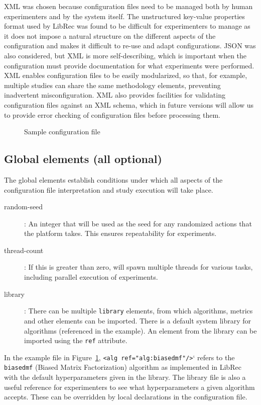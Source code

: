 XML was chosen because configuration files need to be managed both by human experimenters and by the system itself. The unstructured key-value properties format used by LibRec was found to be difficult for experimenters to manage as it does not impose a natural structure on the different aspects of the configuration and makes it difficult to re-use and adapt configurations. JSON was also considered, but XML is more self-describing, which is important when the configuration must provide documentation for what experiments were performed. XML enables configuration files to be easily modularized, so that, for example, multiple studies can share the same methodology elements, preventing inadvertent misconfiguration. XML also provides facilities for validating configuration files against an XML schema, which in future versions will allow us to provide error checking of configuration files before processing them.

\begin{figure}[!htb]
    \centering
    
    \caption{Sample configuration file}
    \label{fig:config}
    \vspace{-0.5in}
\end{figure}

\subsection{Global elements (all optional)}
\label{subsec:lib_auto_global_elements}
The global elements establish conditions under which all aspects of the configuration file interpretation and study execution will take place.

\begin{description}
\item[random-seed]: An integer that will be used as the seed for any randomized actions that the platform takes. This ensures repeatability for experiments.
\item[thread-count]: If this is greater than zero, \libauto{} will spawn multiple threads for various tasks, including parallel execution of experiments.
\item[library]: There can be multiple \texttt{library} elements, from which algorithms, metrics and other elements can be imported. There is a default system library for algorithms (referenced in the example). An element from the library can be imported using the \texttt{ref} attribute.
\end{description}

In the example file in Figure~\ref{fig:config}, \texttt{<alg ref="alg:biasedmf"/>}` refers to the \texttt{biasedmf} (Biased Matrix Factorization) algorithm as implemented in LibRec with the default hyperparameters given in the library. The library file is also a useful reference for experimenters to see what hyperparameters a given algorithm accepts. These can be overridden by local declarations in the configuration file.


